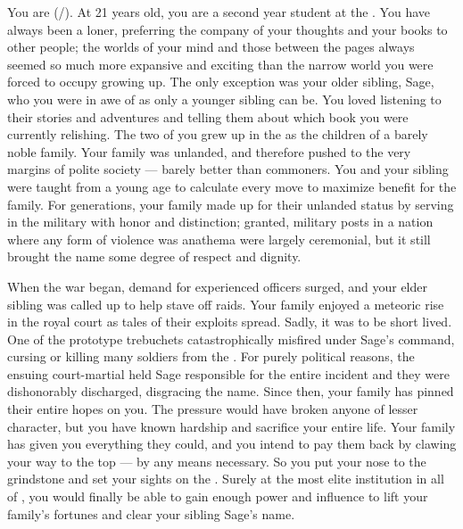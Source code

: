 \documentclass[char]{GL2020}
\begin{document}
\name{\cLibAssist{}}

You are \cLibAssist{\full} (\cLibAssist{\they}/\cLibAssist{\them}). At 21 years old, you are a second year student at the \pSchool{}. You have always been a loner, preferring the company of your thoughts and your books to other people; the worlds of your mind and those between the pages always seemed so much more expansive and exciting than the narrow world you were forced to occupy growing up. The only exception was your older sibling, Sage, who you were in awe of as only a younger sibling can be. You loved listening to their stories and adventures and telling them about which book you were currently relishing. The two of you grew up in the \pFarm{} as the children of a barely noble family. Your family was unlanded, and therefore pushed to the very margins of polite society — barely better than commoners. You and your sibling were taught from a young age to calculate every move to maximize benefit for the family. For generations, your family made up for their unlanded status by serving in the military with honor and distinction; granted, military posts in a nation where any form of violence was anathema were largely ceremonial, but it still brought the \pLibAssist{\formal} name some degree of respect and dignity. 

When the war began, demand for experienced officers surged, and your elder sibling was called up to help stave off \pShippie{} raids. Your family enjoyed a meteoric rise in the royal court as tales of their exploits spread. Sadly, it was to be short lived. One of the prototype trebuchets catastrophically misfired under Sage’s command, cursing or killing many soldiers from the \pTech{}. For purely political reasons, the ensuing court-martial held Sage responsible for the entire incident and they were dishonorably discharged, disgracing the \pLibAssist{\formal} name. Since then, your family has pinned their entire hopes on you. The pressure would have broken anyone of lesser character, but you have known hardship and sacrifice your entire life. Your family has given you everything they could, and you intend to pay them back by clawing your way to the top — by any means necessary. So you put your nose to the grindstone and set your sights on the \pSchool{}. Surely at the most elite institution in all of \pEarth{}, you would finally be able to gain enough power and influence to lift your family’s fortunes and clear your sibling Sage’s name.
\end{document}
